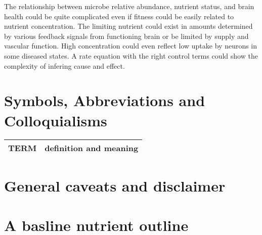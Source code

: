 \documentclass[aps,secnumarabic,balancelastpage,amsmath,amssymb,nofootinbib]{revtex4}
\begin{document}
The relationship between microbe relative abundance,
nutrient status, and brain health could be quite complicated
even if fitness could be easily related to nutrient
concentration. The limiting nutrient could exist
in amounts determined by various feedback signals
from functioning brain or be limited by supply and
vascular function. High concentration could even reflect
low uptake by neurons in some diseased states. A rate
equation with the right control terms could show the complexity
of infering cause and effect. 




\section{Symbols, Abbreviations and Colloquialisms}

\begin{comment}
\end{comment}


\noindent
\begin{tabular}{@{}ll}
TERM & definition and meaning   \\
\hline
\end{tabular} %


\section{General caveats and disclaimer }
\label{appendix:caveats}

%



\section{ A basline nutrient outline  }
\label{appendix:baseline}

\end{document}
